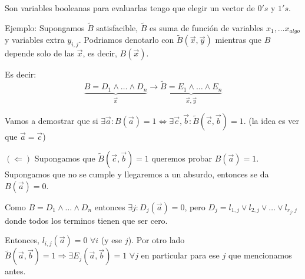 \documentclass[12pt,a4paper]{article}
\begin{document}
Son variables booleanas para evaluarlas tengo que elegir un vector de $0's$ y $1's$.
\medskip

Ejemplo: Supongamos $\widetilde{B}$ satisfacible, $\widetilde{B}$ es suma de función de variables 
$x_{1},\ldots x_{algo}$ y variables extra $y_{i,j}$. Podriamos denotarlo con 
$\widetilde{B}(\overrightarrow{x}, \overrightarrow{y})$ mientras que $B$ depende 
solo de las $\overrightarrow{x}$, es decir, $B(\overrightarrow{x})$.
\medskip

Es decir:
$$\underbrace{B = D_{1} \wedge \ldots \wedge D_{n}}_{\overrightarrow{x}} \to \underbrace{\widetilde{B} = E_{1} \wedge \ldots \wedge E_{n}}_{\overrightarrow{x}, \overrightarrow{y}}$$

Vamos a demostrar que si  
$\exists \overrightarrow{a}: B(\overrightarrow{a}) = 1 \Leftrightarrow \exists \overrightarrow{c}, \overrightarrow{b} : \widetilde{B}(\overrightarrow{c}, \overrightarrow{b}) = 1$.
(la idea es ver que $\overrightarrow{a} = \overrightarrow{c}$)
\medskip

$(\Leftarrow)$ Supongamos que $\widetilde{B}(\overrightarrow{c}, \overrightarrow{b}) =1$ 
queremos probar $B(\overrightarrow{a}) = 1$. Supongamos que no se cumple y llegaremos 
a un absurdo, entonces se da $B(\overrightarrow{a}) = 0$.
\medskip

Como $B = D_{1} \wedge \ldots \wedge D_{n}$ entonces $\exists j : D_{j}(\overrightarrow{a}) = 0$, 
pero $D_{j} = l_{1,j} \vee l_{2,j} \vee \ldots \vee l_{r_{j},j}$ donde todos 
los terminos tienen que ser cero.
\medskip

Entonces, $l_{i,j}(\overrightarrow{a}) = 0\,\, \forall i$ (y ese $j$). Por otro 
lado $\widetilde{B}(\overrightarrow{a}, \overrightarrow{b}) = 1 \Rightarrow \exists E_{j}(\overrightarrow{a},\overrightarrow{b}) = 1\,\, \forall j$
en particular para ese $j$ que mencionamos antes.
\medskip
\end{document}
